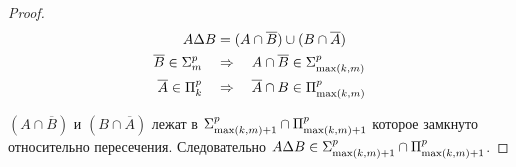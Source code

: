 \begin{proof}
\begin{align*}
A\Delta B&=(A\cap\overline B)\cup(B\cap\overline A)\\
\overline B\in\textbf{$\Sigma_{m}^p$}\quad&\Rightarrow\quad A\cap\overline B \in \textbf{$\Sigma_{\max(k,m)}^p$}\\
\overline A\in\textbf{$\Pi_{k}^p$}\quad&\Rightarrow\quad \overline A\cap B \in \textbf{$\Pi_{\max(k,m)}^p$}
\end{align*}

$(A\cap\overline B)$ и $(B\cap\overline A)$ лежат в $\textbf{$\Sigma_{\max(k,m) + 1}^p$}\cap\textbf{$\Pi_{\max(k,m) + 1}^p$}$ которое замкнуто относительно пересечения. 
Следовательно $A\Delta B\in\textbf{$\Sigma_{\max(k,m) + 1}^p$}\cap\textbf{$\Pi_{\max(k,m) + 1}^p$}$.
\end{proof}